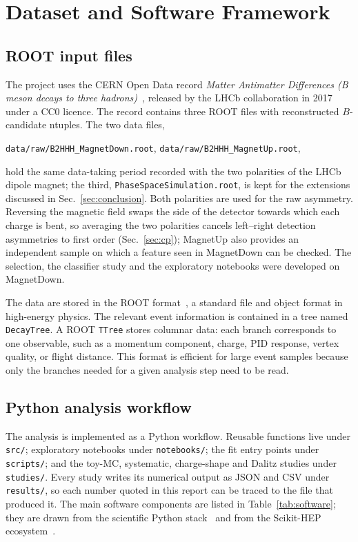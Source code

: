 \section{Dataset and Software Framework}

\subsection{ROOT input files}

The project uses the CERN Open Data record \emph{Matter Antimatter Differences
(B meson decays to three hadrons)}~\cite{b2hhhdata}, released by the LHCb
collaboration in 2017 under a CC0 licence. The record contains three ROOT files
with reconstructed $B$-candidate ntuples. The two data files,
\begin{center}
  \texttt{data/raw/B2HHH\_MagnetDown.root}, \qquad
  \texttt{data/raw/B2HHH\_MagnetUp.root},
\end{center}
hold the same data-taking period recorded with the two polarities of the LHCb
dipole magnet; the third, \texttt{PhaseSpaceSimulation.root}, is kept for the
extensions discussed in Sec.~\ref{sec:conclusion}. Both polarities are used for
the raw asymmetry. Reversing the magnetic field swaps the side of the detector
towards which each charge is bent, so averaging the two polarities cancels
left--right detection asymmetries to first order
(Sec.~\ref{sec:cp}); MagnetUp also provides an independent sample on which a
feature seen in MagnetDown can be checked. The selection, the classifier study and
the exploratory notebooks were developed on MagnetDown.

The data are stored in the ROOT format~\cite{root}, a standard file and object format in high-energy physics. The relevant event information is contained in a tree named \texttt{DecayTree}. A ROOT \texttt{TTree} stores columnar data: each branch corresponds to one observable, such as a momentum component, charge, PID response, vertex quality, or flight distance. This format is efficient for large event samples because only the branches needed for a given analysis step need to be read.

\subsection{Python analysis workflow}

The analysis is implemented as a Python workflow. Reusable functions live under \texttt{src/}; exploratory notebooks under \texttt{notebooks/}; the fit entry points under \texttt{scripts/}; and the toy-MC, systematic, charge-shape and Dalitz studies under \texttt{studies/}. Every study writes its numerical output as JSON and CSV under \texttt{results/}, so each number quoted in this report can be traced to the file that produced it. The main software components are listed in Table~\ref{tab:software}; they are drawn from the scientific Python stack~\cite{numpy,matplotlib} and from the Scikit-HEP ecosystem~\cite{scikithep}.


